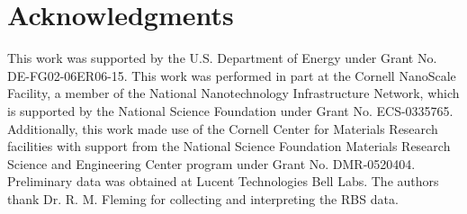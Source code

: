 \section{Acknowledgments}
This work was supported by the U.S. Department of Energy under Grant No. DE-FG02-06ER06-15. 
This work was performed in part at the Cornell NanoScale Facility, a member of the National Nanotechnology Infrastructure Network, which is supported by the National Science Foundation under Grant No. ECS-0335765. Additionally, this work made use of the Cornell Center for Materials Research facilities with support from the National Science Foundation Materials Research Science and Engineering Center program under Grant No. DMR-0520404. Preliminary data was obtained at Lucent Technologies Bell Labs. The authors thank Dr. R. M. Fleming for collecting and interpreting the RBS data.

